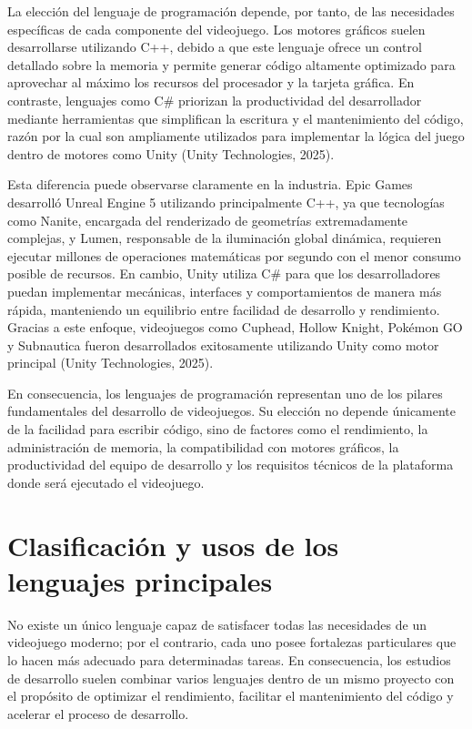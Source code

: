 \documentclass[12pt]{report}
\begin{document}
La elección del lenguaje de programación depende, por tanto, de las necesidades específicas de cada componente del videojuego. Los motores gráficos suelen desarrollarse utilizando C++, debido a que este lenguaje ofrece un control detallado sobre la memoria y permite generar código altamente optimizado para aprovechar al máximo los recursos del procesador y la tarjeta gráfica. En contraste, lenguajes como C\# priorizan la productividad del desarrollador mediante herramientas que simplifican la escritura y el mantenimiento del código, razón por la cual son ampliamente utilizados para implementar la lógica del juego dentro de motores como Unity (Unity Technologies, 2025).

Esta diferencia puede observarse claramente en la industria. Epic Games desarrolló Unreal Engine 5 utilizando principalmente C++, ya que tecnologías como Nanite, encargada del renderizado de geometrías extremadamente complejas, y Lumen, responsable de la iluminación global dinámica, requieren ejecutar millones de operaciones matemáticas por segundo con el menor consumo posible de recursos. En cambio, Unity utiliza C\# para que los desarrolladores puedan implementar mecánicas, interfaces y comportamientos de manera más rápida, manteniendo un equilibrio entre facilidad de desarrollo y rendimiento. Gracias a este enfoque, videojuegos como Cuphead, Hollow Knight, Pokémon GO y Subnautica fueron desarrollados exitosamente utilizando Unity como motor principal (Unity Technologies, 2025).

En consecuencia, los lenguajes de programación representan uno de los pilares fundamentales del desarrollo de videojuegos. Su elección no depende únicamente de la facilidad para escribir código, sino de factores como el rendimiento, la administración de memoria, la compatibilidad con motores gráficos, la productividad del equipo de desarrollo y los requisitos técnicos de la plataforma donde será ejecutado el videojuego.

\section{Clasificación y usos de los lenguajes principales}

No existe un único lenguaje capaz de satisfacer todas las necesidades de un videojuego moderno; por el contrario, cada uno posee fortalezas particulares que lo hacen más adecuado para determinadas tareas. En consecuencia, los estudios de desarrollo suelen combinar varios lenguajes dentro de un mismo proyecto con el propósito de optimizar el rendimiento, facilitar el mantenimiento del código y acelerar el proceso de desarrollo.
\end{document}
